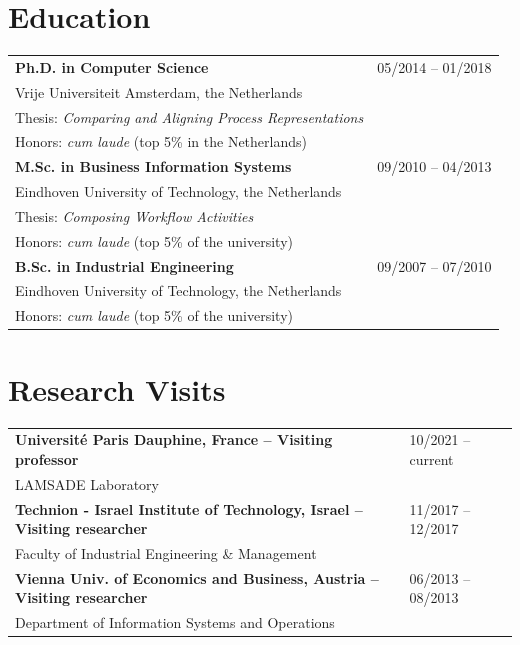 \section{Education}
\begin{tabular}{p{12.5cm}l}
 \normalsize \textbf{Ph.D. in Computer Science } & 	05/2014  --  01/2018 \\
	 Vrije Universiteit Amsterdam, the Netherlands \\
	 Thesis: \textit{Comparing and Aligning Process Representations} \\
	 Honors: \textit{cum laude} (top 5\% in the Netherlands) \\
	\noalign{\smallskip\smallskip}
	
	 \normalsize \textbf{M.Sc. in Business Information Systems } & 09/2010  --  04/2013\\
	 Eindhoven University of Technology, the Netherlands \\
	 Thesis: \textit{Composing Workflow Activities} \\
	Honors: \textit{cum laude} (top 5\% of the university) \\
	\noalign{\smallskip\smallskip}

	
	 \normalsize \textbf{B.Sc. in Industrial Engineering } & 09/2007  --  07/2010 \\
	 Eindhoven University of Technology, the Netherlands \\
	 Honors: \textit{cum laude} (top 5\% of the university)
		
\end{tabular}

\section{Research Visits}
\begin{tabular}{p{12.5cm} p{3cm}  }
	\textbf{Universit\'e Paris Dauphine, France -- Visiting professor} & 10/2021 -- current  \\
	LAMSADE Laboratory \\
	\noalign{\smallskip\smallskip}
	
	\textbf{Technion - Israel Institute of Technology, Israel -- Visiting researcher} & 11/2017 -- 12/2017 \\
	Faculty of Industrial Engineering \& Management \\
	\noalign{\smallskip\smallskip}
	
	\textbf{Vienna Univ. of Economics and Business, Austria -- Visiting researcher} & 06/2013 -- 08/2013\\
	Department of Information Systems and Operations \\
\end{tabular}


